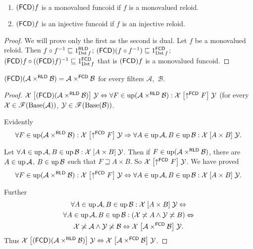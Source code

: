 \begin{prop}
~
\begin{enumerate}
\item $(\mathsf{FCD}) f$ is a monovalued funcoid if $f$ is a monovalued reloid.
\item $(\mathsf{FCD}) f$ is an injective funcoid if $f$ is an injective reloid.
\end{enumerate}
\end{prop}
\begin{proof}
We will prove only the first as the second is dual. Let $f$ be a
monovalued reloid. Then $f\circ f^{-1}\sqsubseteq1_{\operatorname{Dst} f}^{\mathsf{RLD}}$;
$(\mathsf{FCD})(f\circ f^{-1})\sqsubseteq1_{\operatorname{Dst} f}^{\mathsf{FCD}}$; $(\mathsf{FCD}) f\circ((\mathsf{FCD}) f)^{-1}\sqsubseteq1_{\operatorname{Dst} f}^{\mathsf{FCD}}$
that is $(\mathsf{FCD}) f$ is a monovalued funcoid.\end{proof}
\begin{prop}
\label{fcd-of-rprod}$(\mathsf{FCD})(\mathcal{A}\times^{\mathsf{RLD}}\mathcal{B})=\mathcal{A}\times^{\mathsf{FCD}}\mathcal{B}$
for every filters $\mathcal{A}$,~$\mathcal{B}$.\end{prop}
\begin{proof}
$\mathcal{X}\mathrel{\left[(\mathsf{FCD})(\mathcal{A}\times^{\mathsf{RLD}}\mathcal{B})\right]}\mathcal{Y}\Leftrightarrow\forall F\in\operatorname{up}(\mathcal{A}\times^{\mathsf{RLD}}\mathcal{B}):\mathcal{X}\mathrel{\left[\uparrow^{\mathsf{FCD}}F\right]}\mathcal{Y}$
(for every $\mathcal{X}\in\mathscr{F}(\operatorname{Base}(\mathcal{A}))$, $\mathcal{Y}\in\mathscr{F}(\operatorname{Base}(\mathcal{B}))$.

Evidently
\[
\forall F\in\operatorname{up}(\mathcal{A}\times^{\mathsf{RLD}}\mathcal{B}):\mathcal{X}\mathrel{\left[\uparrow^{\mathsf{FCD}}F\right]}\mathcal{Y}\Rightarrow\forall A\in\operatorname{up}\mathcal{A},B\in\operatorname{up}\mathcal{B}:\mathcal{X}\mathrel{\left[A\times B\right]}\mathcal{Y}.
\]


Let $\forall A\in\operatorname{up}\mathcal{A},B\in\operatorname{up}\mathcal{B}:\mathcal{X}\mathrel{\left[A\times B\right]}\mathcal{Y}$.
Then if $F\in\operatorname{up}(\mathcal{A}\times^{\mathsf{RLD}}\mathcal{B})$, there
are $A\in\operatorname{up}\mathcal{A}$, $B\in\operatorname{up}\mathcal{B}$ such that $F\sqsupseteq A\times B$.
So $\mathcal{X}\mathrel{\left[\uparrow^{\mathsf{FCD}}F\right]}\mathcal{Y}$. We
have proved
\[
\forall F\in\operatorname{up}(\mathcal{A}\times^{\mathsf{RLD}}\mathcal{B}):\mathcal{X}\mathrel{\left[\uparrow^{\mathsf{FCD}}F\right]}\mathcal{Y}\Leftrightarrow\forall A\in\operatorname{up}\mathcal{A},B\in\operatorname{up}\mathcal{B}:\mathcal{X}\mathrel{\left[A\times B\right]}\mathcal{Y}.
\]


Further
\begin{multline*}
\forall A\in\operatorname{up}\mathcal{A},B\in\operatorname{up}\mathcal{B}:\mathcal{X}\mathrel{\left[A\times B\right]}\mathcal{Y}\Leftrightarrow\\
\forall A\in\operatorname{up}\mathcal{A},B\in\operatorname{up}\mathcal{B}:(\mathcal{X}\not\asymp A\land\mathcal{Y}\not\asymp B)\Leftrightarrow\\
\mathcal{X}\not\asymp\mathcal{A}\land\mathcal{Y}\not\asymp\mathcal{B}\Leftrightarrow\mathcal{X}\mathrel{\left[\mathcal{A}\times^{\mathsf{FCD}}\mathcal{B}\right]}\mathcal{Y}.
\end{multline*}
Thus $\mathcal{X}\mathrel{\left[(\mathsf{FCD})(\mathcal{A}\times^{\mathsf{RLD}}\mathcal{B})\right]}\mathcal{Y}\Leftrightarrow\mathcal{X}\mathrel{\left[\mathcal{A}\times^{\mathsf{FCD}}\mathcal{B}\right]}\mathcal{Y}$.\end{proof}
